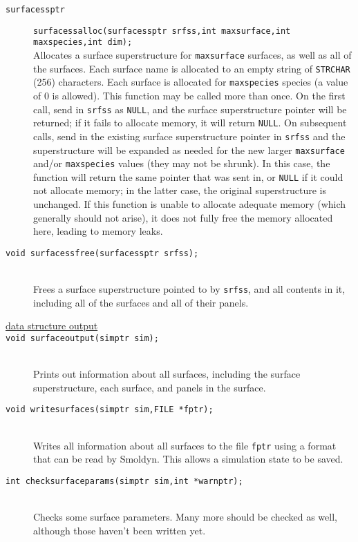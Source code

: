 \documentclass {book}
\begin{document}
\begin{description}
\item[\texttt{surfacessptr}]
\texttt{surfacessalloc(surfacessptr srfss,int maxsurface,int maxspecies,int dim);}
\hfill \\
Allocates a surface superstructure for \texttt{maxsurface} surfaces, as well as all of the surfaces.  Each surface name is allocated to an empty string of \texttt{STRCHAR} (256) characters.  Each surface is allocated for \texttt{maxspecies} species (a value of 0 is allowed).  This function may be called more than once.  On the first call, send in \texttt{srfss} as \texttt{NULL}, and the surface superstructure pointer will be returned; if it fails to allocate memory, it will return \texttt{NULL}.  On subsequent calls, send in the existing surface superstructure pointer in \texttt{srfss} and the superstructure will be expanded as needed for the new larger \texttt{maxsurface} and/or \texttt{maxspecies} values (they may not be shrunk).  In this case, the function will return the same pointer that was sent in, or \texttt{NULL} if it could not allocate memory; in the latter case, the original superstructure is unchanged.  If this function is unable to allocate adequate memory (which generally should not arise), it does not fully free the memory allocated here, leading to memory leaks.

\item[\texttt{void surfacessfree(surfacessptr srfss);}]
\hfill \\
Frees a surface superstructure pointed to by \texttt{srfss}, and all contents in it, including all of the surfaces and all of their panels.

\item[\underline{data structure output}]

\item[\texttt{void surfaceoutput(simptr sim);}]
\hfill \\
Prints out information about all surfaces, including the surface superstructure, each surface, and panels in the surface.

\item[\texttt{void writesurfaces(simptr sim,FILE *fptr);}]
\hfill \\
Writes all information about all surfaces to the file \texttt{fptr} using a format that can be read by Smoldyn.  This allows a simulation state to be saved.

\item[\texttt{int checksurfaceparams(simptr sim,int *warnptr);}]
\hfill \\
Checks some surface parameters.  Many more should be checked as well, although those haven't been written yet.


\end{description}
\end{document}
